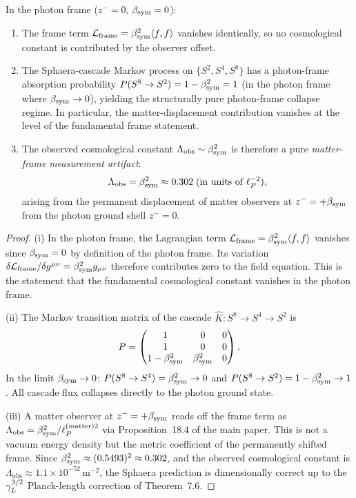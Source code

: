 \begin{theorem}
\label{thm:lambda-zero}
In the photon frame ($z^- = 0$, $\beta_{\mathrm{sym}} = 0$):
\begin{enumerate}
\item[(i)] The frame term $\mathcal{L}_{\mathrm{frame}} = \beta_{\mathrm{sym}}^2
  \langle f,f\rangle$ vanishes identically, so no cosmological
  constant is contributed by the observer offset.
\item[(ii)] The Sphaera-cascade Markov process on $\{S^2, S^4, S^8\}$
  has a photon-frame absorption probability
  $P(S^8 \to S^2) = 1 - \beta_{\mathrm{sym}}^2 = 1$ (in the photon frame
  where $\beta_{\mathrm{sym}}\to 0$), yielding the structurally pure photon-frame collapse regime. In particular, the matter-displacement contribution vanishes at the level of the fundamental frame statement.
\item[(iii)] The observed cosmological constant
  $\Lambda_{\mathrm{obs}} \sim \beta_{\mathrm{sym}}^2$ is therefore a pure
  \emph{matter-frame measurement artifact}:
  \[
    \Lambda_{\mathrm{obs}}
    = \beta_{\mathrm{sym}}^2 \approx 0.302\;(\text{in units of }\ell_P^{-2}),
  \]
  arising from the permanent displacement of matter observers at
  $z^- = +\beta_{\mathrm{sym}}$ from the photon ground shell $z^- = 0$.
\end{enumerate}
\end{theorem}

\begin{proof}
(i) In the photon frame, the Lagrangian term
$\mathcal{L}_{\mathrm{frame}} = \beta_{\mathrm{sym}}^2\langle f,f\rangle$ vanishes
since $\beta_{\mathrm{sym}} = 0$ by definition of the photon frame. Its variation
$\delta\mathcal{L}_{\mathrm{frame}}/\delta g^{\mu\nu} = \beta_{\mathrm{sym}}^2
g_{\mu\nu}$ therefore contributes zero to the field equation.
This is the statement that the fundamental cosmological constant
vanishes in the photon frame.

(ii) The Markov transition matrix of the cascade
$\hat{K}: S^8 \to S^4 \to S^2$ is
\[
  P = \begin{pmatrix}1&0&0\\1&0&0\\1-\beta_{\mathrm{sym}}^2&\beta_{\mathrm{sym}}^2&0\end{pmatrix}.
\]
In the limit $\beta_{\mathrm{sym}}\to 0$: $P(S^8\to S^4) = \beta_{\mathrm{sym}}^2 \to 0$ and
$P(S^8\to S^2) = 1-\beta_{\mathrm{sym}}^2 \to 1$.
All cascade flux collapses directly to the photon ground state.

(iii) A matter observer at $z^- = +\beta_{\mathrm{sym}}$ reads off the frame term
as $\Lambda_{\mathrm{obs}} = \beta_{\mathrm{sym}}^2/\ell_P^{(\mathrm{matter})2}$ via
Proposition~18.4 of the main paper. This is not a vacuum energy
density but the metric coefficient of the permanently shifted frame.
Since $\beta_{\mathrm{sym}}^2 \approx (0.5493)^2 \approx 0.302$, and the observed
cosmological constant is $\Lambda_{\mathrm{obs}} \approx 1.1\times
10^{-52}\,\mathrm{m}^{-2}$, the Sphaera prediction is dimensionally
correct up to the $\gamma_L^{3/2}$ Planck-length correction of Theorem~7.6.
\end{proof}

